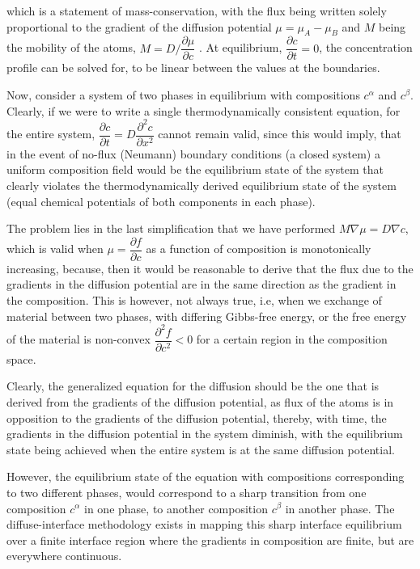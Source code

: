 \documentclass[english]{iambook}
\begin{document}
which is a statement of mass-conservation, with the flux being written solely
proportional to the gradient of the diffusion potential $\mu=\mu_A- \mu_B$ and $M$ being the mobility
of the atoms, $M=D/\dfrac{\partial \mu}{\partial c}$ . 
At equilibrium, $\dfrac{\partial c}{\partial t}=0$, the concentration 
profile can be solved for, to be linear between the values at
the boundaries.

Now, consider a system of two phases in equilibrium with
compositions $c^{\alpha}$ and $c^{\beta}$. Clearly, if we 
were to write a single thermodynamically consistent equation, 
for the entire system, $\dfrac{\partial c}{\partial t} 
= D\dfrac{\partial^{2}c}{\partial x^{2}}$
cannot remain valid, since this would imply, that in the 
event of no-flux (Neumann) boundary conditions (a closed system) 
a uniform composition field would be the equilibrium state of
the system that clearly violates the thermodynamically derived
equilibrium state of the system (equal chemical potentials 
of both components in each phase).

The problem lies in the last simplification that we 
have performed $M\nabla \mu = D\nabla c$, 
which is valid 
when $\mu = \dfrac{\partial f}{\partial c}$ 
as a function of composition 
is monotonically increasing, because, then it would
be reasonable to derive that the flux due to the 
gradients in the diffusion potential are in the same
direction as the gradient in the composition. This is however,
not always true, i.e, when we exchange of material between 
two phases, with differing Gibbs-free energy, or the 
free energy of the material is non-convex 
$\dfrac{\partial^{2}f}{\partial c^{2}} < 0$
for a certain region in the composition space. 

Clearly, the generalized equation for the diffusion 
should be the one that is derived from the gradients
of the diffusion potential, as flux of the atoms is
in opposition to the gradients of the diffusion potential, 
thereby, with time, the gradients in the diffusion potential
in the system diminish, with the equilibrium state being 
achieved when the entire system is at the same diffusion 
potential.

However, the equilibrium state of the equation with 
compositions corresponding to two different phases, 
would correspond to a sharp transition from one composition
$c^{\alpha}$ in one phase, to another composition $c^{\beta}$
in another phase. The diffuse-interface methodology exists
in mapping this sharp interface equilibrium over a finite
interface region where the gradients in composition are finite,
but are everywhere continuous.
\end{document}
